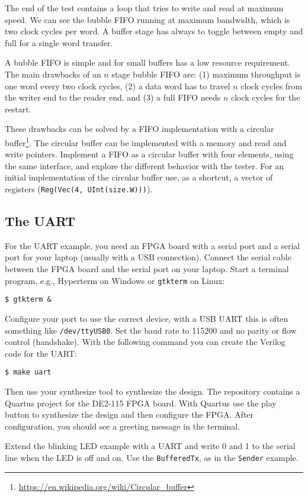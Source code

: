 \documentclass[%
    10pt,
    headinclude, footexclude,
    openright, %
    notitlepage,
    cleardoubleempty,
    headsepline,
    pointlessnumbers,
    bibtotoc, idxtotoc,
    ]{scrbook}
\newcommand{\code}[1]{{\small{\texttt{#1}}}}
\newcommand{\myref}[2]{\href{#1}{#2}}
\renewcommand{\myref}[2]{{#2}{\footnote{\url{#1}}}}
\begin{document}
The end of the test contains a loop that tries to write and read at maximum speed.
We can see the bubble FIFO running at maximum bandwidth, which is two
clock cycles per word. A buffer stage has always to toggle between empty
and full for a single word transfer.

A bubble FIFO is simple and for small buffers has a low resource requirement.
The main drawbacks of an $n$ stage bubble FIFO are: (1) maximum throughput is
one word every two clock cycles, (2) a data word has to travel $n$ clock cycles
from the writer end to the reader end, and (3) a full FIFO needs $n$ clock cycles
for the restart.

These drawbacks can be solved by a FIFO implementation with a
\myref{https://en.wikipedia.org/wiki/Circular_buffer}{circular buffer}.
The circular buffer can be implemented with a memory and
read and write pointers.
Implement a FIFO as a circular buffer with four elements, using the same
interface, and explore the different behavior with the tester.
For an initial implementation of the circular buffer use, as a shortcut,
a vector of registers (\code{Reg(Vec(4, UInt(size.W)))}).

\subsection{The UART}

For the UART example, you need an FPGA board with a serial port and
a serial port for your laptop (usually with a USB connection).
Connect the serial cable between the FPGA board and the serial port on
your laptop. Start a terminal program, e.g., Hyperterm on Windows
or \code{gtkterm} on Linux:
\begin{verbatim}
$ gtkterm &
\end{verbatim}
Configure your port to use the correct device, with a USB UART this
is often something like \code{/dev/ttyUSB0}. Set the baud rate to 115200
and no parity or flow control (handshake).
With the following command you can create the Verilog code for the UART:
\begin{verbatim}
$ make uart
\end{verbatim}
Then use your synthesize tool to synthesize the design.
The repository contains a Quartus project for the DE2-115 FPGA board.
With Quartus use the play button to synthesize the design and then configure
the FPGA.
After configuration, you should see a greeting message in the terminal.

Extend the blinking LED example with a UART and write 0 and 1 to the serial
line when the LED is off and on. Use the \code{BufferedTx}, as in the \code{Sender}
example.
\end{document}
